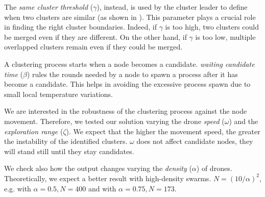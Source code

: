 The \emph{same cluster threshold} ($\gamma$), instead, is used by the cluster leader to define when two clusters are similar (as shown in ).
%
This parameter plays a crucial role in finding the right cluster boundaries.
 Indeed, if $\gamma$ is too high, two clusters could be merged even if they are different.
 On the other hand, if $\gamma$ is too low, multiple overlapped clusters remain even if they could be merged.

A clustering process starts when a node becomes a candidate.
 \emph{waiting candidate time} ($\beta$) rules the rounds needed by a node to spawn a process after it has become a candidate.
 This helps in avoiding the excessive process spawn due to small local temperature variations.

We are interested in the robustness of the clustering process against the node movement. Therefore, we tested our
 solution varying the drone \emph{speed} ($\omega$) and the \emph{exploration range} ($\zeta$).
 We expect that the higher the movement speed, the greater the instability of the identified clusters.
 $\omega$ does not affect candidate nodes, they will stand still until they stay candidates.

We check also how the output changes varying the \emph{density} ($\alpha$) of drones.
 Theoretically, we expect a better result with high-density swarms.
$
 N = (10 / \alpha) ^ 2
$,
e.g. with $\alpha = 0.5, N = 400$ and with $\alpha = 0.75, N = 173$.

